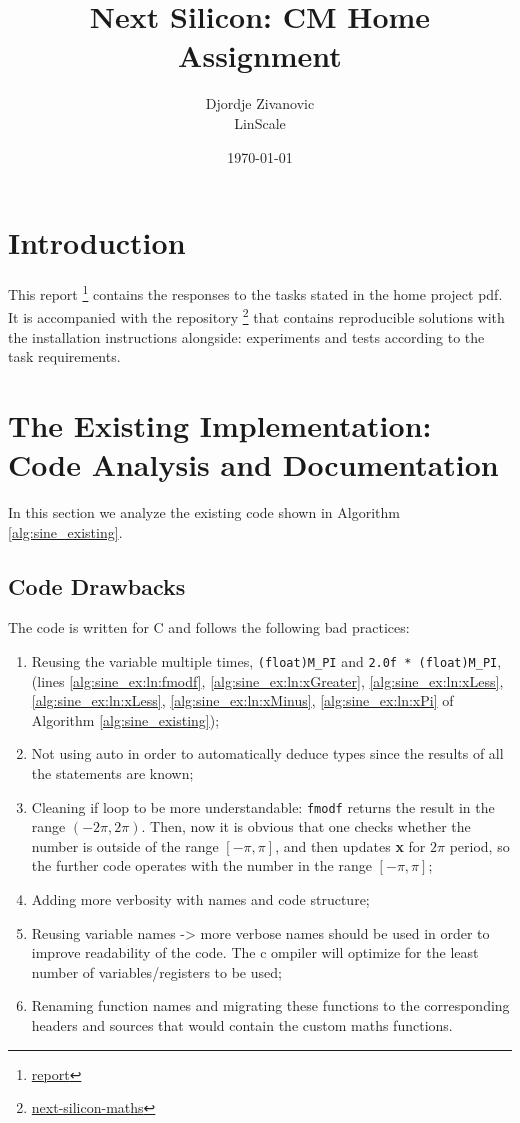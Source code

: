 \documentclass[12pt]{article}
\title{Next Silicon: CM Home Assignment}
\author{Djordje Zivanovic \\ \small{LinScale}}
\date{\today}
\begin{document}
\maketitle
\tableofcontents
\newpage

\section{Introduction}
This report \footnote{\href{https://github.com/popina1994/Next-Silicon-Report}{report}} contains the responses to the tasks stated in the home project pdf.
It is accompanied with the repository \footnote{\href{https://github.com/popina1994/next-silicon-maths}{next-silicon-maths}} that contains reproducible solutions with the installation instructions alongside: experiments and tests according to the task requirements.
\section{The Existing Implementation: Code Analysis and Documentation}
In this section we analyze the existing code shown in Algorithm \ref{alg:sine_existing}.

\subsection{Code Drawbacks}
The code is written for C and follows the following bad practices:
\begin{enumerate}
    \item Reusing the variable multiple times,  \texttt{(float)M\_PI} and \texttt{2.0f * (float)M\_PI}, (lines \ref{alg:sine_ex:ln:fmodf}, \ref{alg:sine_ex:ln:xGreater}, \ref{alg:sine_ex:ln:xLess}, \ref{alg:sine_ex:ln:xLess}, \ref{alg:sine_ex:ln:xMinus}, \ref{alg:sine_ex:ln:xPi} of Algorithm \ref{alg:sine_existing});
    \item Not using auto in order to automatically deduce types since the results of all the statements are known;
    \item Cleaning if loop to be more understandable: \texttt{fmodf} returns the result in the range $(-2 \pi, 2 \pi)$. Then, now it is obvious that one checks whether the number is outside of the range $[-\pi, \pi]$, and then updates \textbf{x} for $2 \pi$ period, so the further code operates with the number in the range $[-\pi, \pi]$;
    \item Adding more verbosity with names and code structure;
    \item Reusing variable names -> more verbose names should be used in order to improve readability of the code. The c ompiler will optimize for the least number of variables/registers to be used;
    \item Renaming function names and migrating these functions to the corresponding headers and sources that would contain the custom maths functions.
\end{enumerate}
\end{document}
